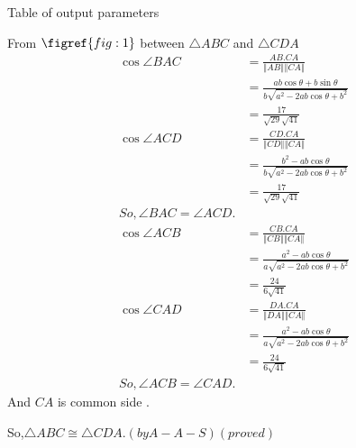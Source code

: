 \documentclass[12pt]{article}
\newcommand\norm[1]{\left\Vert#1\right\Vert}
\providecommand{\brak}[1]{\ensuremath{\left(#1\right)}}
\begin{document}
\begin{table}[H]
    \centering
    
    \caption{Table of output parameters}
    \label{tab:tab:2}
\end{table}  
From $\figref{fig:1}$ between $\triangle ABC $ and $\triangle CDA$
\begin{align}
\cos{\angle BAC} &= \frac{AB.CA}{\norm{AB}\norm{CA}}\\
&=\frac{ab\cos{\theta}+b\sin{\theta}}{b\sqrt{a^2-2ab\cos{\theta}+b^2}}\\
&=\frac{17}{\sqrt{29}\sqrt{41}}\\
\cos{\angle ACD} &= \frac{CD.CA}{\norm{CD}\norm{CA}}\\
&= \frac{b^2-ab\cos{\theta}}{b\sqrt{a^2-2ab\cos{\theta}+b^2}}\\
&=\frac{17}{\sqrt{29}\sqrt{41}}\\
So,\angle BAC = \angle ACD.\\
\cos{\angle ACB} &= \frac{CB.CA}{\norm{CB}\norm{CA}}\\
&=\frac{a^2-ab\cos{\theta}}{a\sqrt{a^2-2ab\cos{\theta}+b^2}}\\
&=\frac{24}{6\sqrt{41}}\\
\cos{\angle} CAD &= \frac{DA.CA}{\norm{DA}\norm{CA}}\\
&=\frac{a^2-ab\cos{\theta}}{a\sqrt{a^2-2ab\cos{\theta}+b^2}}\\
&=\frac{24}{6\sqrt{41}}\\
So,\angle ACB = \angle CAD.
\end{align}
And $CA$ is common side .

So,$\triangle ABC \cong \triangle CDA.\brak{by A-A-S}\brak{proved}$
\end{document}
